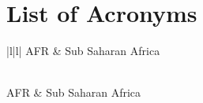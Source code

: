 \documentclass[letterpaper,10pt,english]{sphinxmanual}
\begin{document}
\section{List of Acronyms}
\label{\detokenize{glossary_acr:list-of-acronyms}}

\begin{savenotes}\sphinxatlongtablestart\begin{longtable}{|l|l|}
\hline
\sphinxstyletheadfamily 
AFR
&\sphinxstyletheadfamily 
Sub Saharan Africa
\\
\hline
\endfirsthead

%
{}\\
\hline
\sphinxstyletheadfamily 
AFR
&\sphinxstyletheadfamily 
Sub Saharan Africa
\\
\hline
\endhead

\hline
{}\\
\endfoot

\endlastfoot


\end{longtable}
\end{savenotes}
\end{document}
